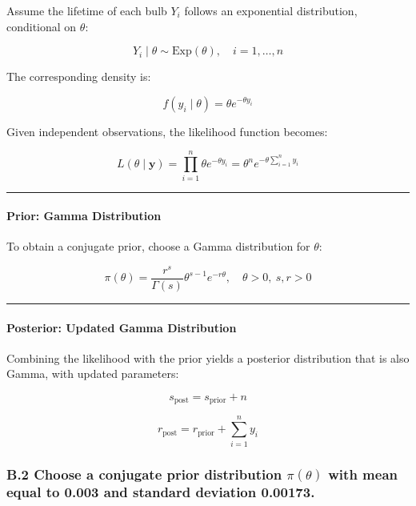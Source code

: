\documentclass[
]{article}
\begin{document}
Assume the lifetime of each bulb \(Y_i\) follows an exponential
distribution, conditional on \(\theta\):

\[
Y_i \mid \theta \sim \text{Exp}(\theta), \quad i = 1, \dots, n
\]

The corresponding density is:

\[
f(y_i \mid \theta) = \theta e^{-\theta y_i}
\]

Given independent observations, the likelihood function becomes:

\[
L(\theta \mid \mathbf{y}) = \prod_{i=1}^{n} \theta e^{-\theta y_i} = \theta^n e^{-\theta \sum_{i=1}^n y_i}
\]

\begin{center}\rule{0.5\linewidth}{0.5pt}\end{center}

\paragraph{Prior: Gamma Distribution}\label{prior-gamma-distribution}

To obtain a conjugate prior, choose a Gamma distribution for \(\theta\):

\[
\pi(\theta) = \frac{r^s}{\Gamma(s)} \theta^{s - 1} e^{-r \theta}, \quad \theta > 0,\ s, r > 0
\]

\begin{center}\rule{0.5\linewidth}{0.5pt}\end{center}

\paragraph{Posterior: Updated Gamma
Distribution}\label{posterior-updated-gamma-distribution}

Combining the likelihood with the prior yields a posterior distribution
that is also Gamma, with updated parameters:

\[
s_{\text{post}} = s_{\text{prior}} + n
\]

\[
r_{\text{post}} = r_{\text{prior}} + \sum_{i=1}^{n} y_i
\]

\subsubsection{\texorpdfstring{B.2 Choose a conjugate prior distribution
\(\pi(\theta)\) with mean equal to 0.003 and standard deviation
0.00173.}{B.2 Choose a conjugate prior distribution \textbackslash pi(\textbackslash theta) with mean equal to 0.003 and standard deviation 0.00173.}}\label{b.2-choose-a-conjugate-prior-distribution-pitheta-with-mean-equal-to-0.003-and-standard-deviation-0.00173.}
\end{document}

